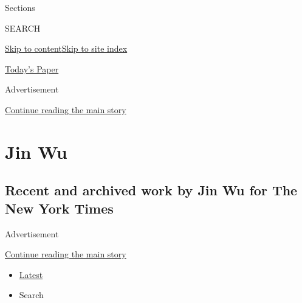 Sections

SEARCH

\protect\hyperlink{site-content}{Skip to
content}\protect\hyperlink{site-index}{Skip to site index}

\href{https://myaccount.nytimes3xbfgragh.onion/auth/login?response_type=cookie\&client_id=vi}{}

\href{https://www.nytimes3xbfgragh.onion/section/todayspaper}{Today's
Paper}

Advertisement

\protect\hyperlink{after-top}{Continue reading the main story}

\hypertarget{jin-wu}{%
\section{Jin Wu}\label{jin-wu}}

\hypertarget{recent-and-archived-work-by-jin-wu-for-the-new-york-times}{%
\subsection{Recent and archived work by Jin Wu for The New York
Times}\label{recent-and-archived-work-by-jin-wu-for-the-new-york-times}}

Advertisement

\protect\hyperlink{after-mid1}{Continue reading the main story}

\begin{itemize}
\tightlist
\item
  \protect\hyperlink{stream-panel}{Latest}
\item
  Search
\end{itemize}

